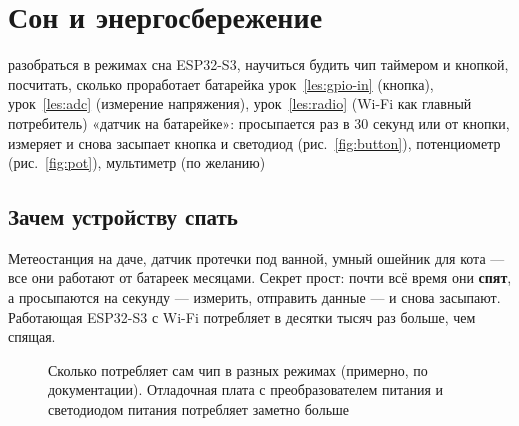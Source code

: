 \section{Сон и энергосбережение}
\label{les:sleep}
\lessonintro
  {разобраться в режимах сна ESP32-S3, научиться будить чип таймером и кнопкой, посчитать, сколько проработает батарейка}
  {урок~\ref{les:gpio-in} (кнопка), урок~\ref{les:adc} (измерение напряжения), урок~\ref{les:radio} (Wi-Fi как главный потребитель)}
  {«датчик на батарейке»: просыпается раз в 30 секунд или от кнопки, измеряет и снова засыпает}
  {кнопка и светодиод (рис.~\ref{fig:button}), потенциометр (рис.~\ref{fig:pot}), мультиметр (по желанию)}

\subsection{Зачем устройству спать}

Метеостанция на даче, датчик протечки под ванной, умный ошейник для кота --- все они работают от батареек
месяцами. Секрет прост: почти всё время они \textbf{спят}, а просыпаются на секунду --- измерить, отправить
данные --- и снова засыпают. Работающая ESP32-S3 с Wi-Fi потребляет в десятки тысяч раз больше, чем спящая.

\begin{figure}[H]
\centering
{}
\caption{Сколько потребляет сам чип в разных режимах (примерно, по документации).
Отладочная плата с преобразователем питания и светодиодом питания потребляет заметно больше}
\end{figure}

